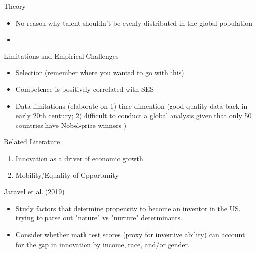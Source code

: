\begin{frame}{Theory}
\begin{itemize}
\item No reason why talent shouldn't be evenly distributed in the global population
  \item 
\end{itemize}
\end{frame}

\begin{frame}{Limitations and Empirical Challenges}
\begin{itemize}
\item Selection (remember where you wanted to go with this)
\item Competence is positively correlated with SES
  \item Data limitations (elaborate on 1) time dimention (good quality data back in early 20th century; 2) difficult to conduct a global analysis given that only 50 countries have Nobel-prize winners )
\end{itemize}
\end{frame}

\begin{frame}{Related Literature}
\begin{enumerate}
\item Innovation as a driver of economic growth
  \item Mobility/Equality of Opportunity

\end{enumerate}

\end{frame}

\begin{frame}{Jaravel et al. (2019)}
  
  \begin{itemize}
  \item Study factors that determine propensity to become an inventor in the US, trying to parse out "nature" vs "nurture" determinants.
\item Consider whether math test scores (proxy for inventive ability) can account for the gap in innovation by income, race, and/or gender.    

\end{itemize}

\hyperlink{supplem2}{}

\end{frame}

